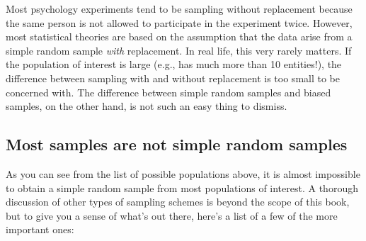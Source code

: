\documentclass[
]{book}
\theoremstyle{definition}
\theoremstyle{definition}
\theoremstyle{definition}
\theoremstyle{definition}
\theoremstyle{remark}
\begin{document}
Most psychology experiments tend to be sampling without replacement because the same person is not allowed to participate in the experiment twice. However, most statistical theories are based on the assumption that the data arise from a simple random sample \emph{with} replacement. In real life, this very rarely matters. If the population of interest is large (e.g., has much more than 10 entities!), the difference between sampling with and without replacement is too small to be concerned with. The difference between simple random samples and biased samples, on the other hand, is not such an easy thing to dismiss.

\hypertarget{most-samples-are-not-simple-random-samples}{%
\subsection{Most samples are not simple random samples}\label{most-samples-are-not-simple-random-samples}}

As you can see from the list of possible populations above, it is almost impossible to obtain a simple random sample from most populations of interest. A thorough discussion of other types of sampling schemes is beyond the scope of this book, but to give you a sense of what's out there, here's a list of a few of the more important ones:
\end{document}
